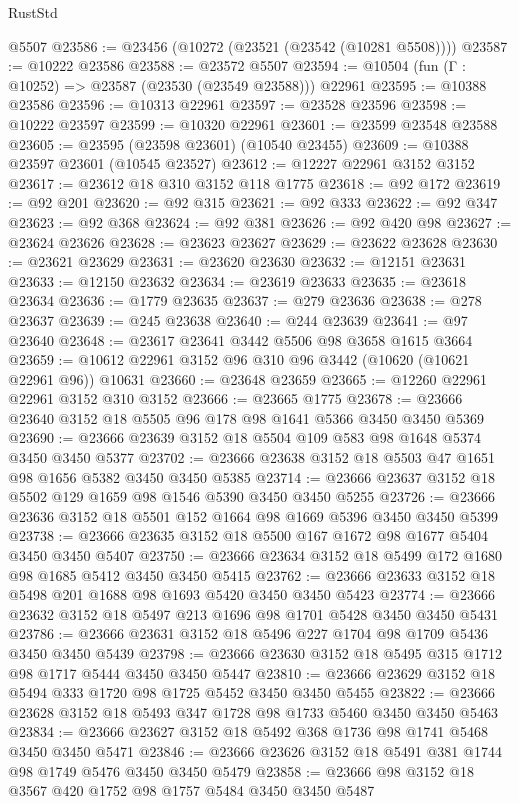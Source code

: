 \begin{lexlean}{RustStd}
\begin{coremodule}
    @5507
@23586 := @23456 (@10272 (@23521 (@23542 (@10281 @5508))))
@23587 := @10222 @23586
@23588 := @23572 @5507
@23594 := @10504 (fun (Γ : @10252) => @23587 (@23530 (@23549 @23588))) @22961
@23595 := @10388 @23586
@23596 := @10313 @22961
@23597 := @23528 @23596
@23598 := @10222 @23597
@23599 := @10320 @22961
@23601 := @23599 @23548 @23588
@23605 := @23595 (@23598 @23601) (@10540 @23455)
@23609 := @10388 @23597 @23601 (@10545 @23527)
@23612 := @12227 @22961 @3152 @3152
@23617 := @23612 @18 @310 @3152 @118 @1775
@23618 := @92 @172
@23619 := @92 @201
@23620 := @92 @315
@23621 := @92 @333
@23622 := @92 @347
@23623 := @92 @368
@23624 := @92 @381
@23626 := @92 @420 @98
@23627 := @23624 @23626
@23628 := @23623 @23627
@23629 := @23622 @23628
@23630 := @23621 @23629
@23631 := @23620 @23630
@23632 := @12151 @23631
@23633 := @12150 @23632
@23634 := @23619 @23633
@23635 := @23618 @23634
@23636 := @1779 @23635
@23637 := @279 @23636
@23638 := @278 @23637
@23639 := @245 @23638
@23640 := @244 @23639
@23641 := @97 @23640
@23648 := @23617 @23641 @3442 @5506 @98 @3658 @1615 @3664
@23659 := @10612 @22961 @3152 @96 @310 @96 @3442 (@10620 (@10621 @22961 @96)) @10631
@23660 := @23648 @23659
@23665 := @12260 @22961 @22961 @3152 @310 @3152
@23666 := @23665 @1775
@23678 := @23666 @23640 @3152 @18 @5505 @96 @178 @98 @1641 @5366 @3450 @3450 @5369
@23690 := @23666 @23639 @3152 @18 @5504 @109 @583 @98 @1648 @5374 @3450 @3450 @5377
@23702 := @23666 @23638 @3152 @18 @5503 @47 @1651 @98 @1656 @5382 @3450 @3450 @5385
@23714 := @23666 @23637 @3152 @18 @5502 @129 @1659 @98 @1546 @5390 @3450 @3450 @5255
@23726 := @23666 @23636 @3152 @18 @5501 @152 @1664 @98 @1669 @5396 @3450 @3450 @5399
@23738 := @23666 @23635 @3152 @18 @5500 @167 @1672 @98 @1677 @5404 @3450 @3450 @5407
@23750 := @23666 @23634 @3152 @18 @5499 @172 @1680 @98 @1685 @5412 @3450 @3450 @5415
@23762 := @23666 @23633 @3152 @18 @5498 @201 @1688 @98 @1693 @5420 @3450 @3450 @5423
@23774 := @23666 @23632 @3152 @18 @5497 @213 @1696 @98 @1701 @5428 @3450 @3450 @5431
@23786 := @23666 @23631 @3152 @18 @5496 @227 @1704 @98 @1709 @5436 @3450 @3450 @5439
@23798 := @23666 @23630 @3152 @18 @5495 @315 @1712 @98 @1717 @5444 @3450 @3450 @5447
@23810 := @23666 @23629 @3152 @18 @5494 @333 @1720 @98 @1725 @5452 @3450 @3450 @5455
@23822 := @23666 @23628 @3152 @18 @5493 @347 @1728 @98 @1733 @5460 @3450 @3450 @5463
@23834 := @23666 @23627 @3152 @18 @5492 @368 @1736 @98 @1741 @5468 @3450 @3450 @5471
@23846 := @23666 @23626 @3152 @18 @5491 @381 @1744 @98 @1749 @5476 @3450 @3450 @5479
@23858 := @23666 @98 @3152 @18 @3567 @420 @1752 @98 @1757 @5484 @3450 @3450 @5487

\end{coremodule}
\end{lexlean}
